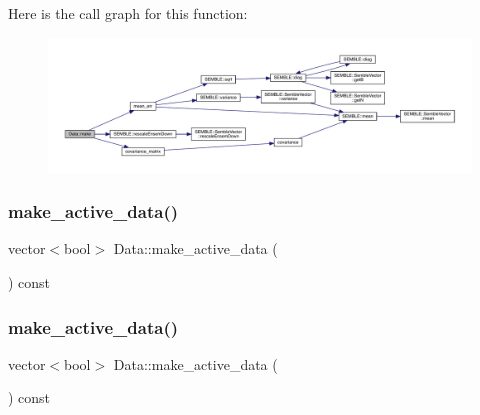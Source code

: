 Here is the call graph for this function\+:
\nopagebreak
\begin{figure}[H]
\begin{center}
\leavevmode
\includegraphics[width=350pt]{d0/df3/classData_acf9b4e6e52730e9da47d82bda61ac1ca_cgraph}
\end{center}
\end{figure}
\mbox{\label{classData_af5d089365e8be78e4cd486bda87f37b4}} 
\subsubsection{\texorpdfstring{make\_active\_data()}{make\_active\_data()}\hspace{0.1cm}{\footnotesize\ttfamily [1/2]}}
{\footnotesize\ttfamily vector$<$bool$>$ Data\+::make\+\_\+active\+\_\+data (\begin{DoxyParamCaption}{ }\end{DoxyParamCaption}) const\hspace{0.3cm}{\ttfamily [inline]}}

\mbox{\label{classData_af5d089365e8be78e4cd486bda87f37b4}} 
\subsubsection{\texorpdfstring{make\_active\_data()}{make\_active\_data()}\hspace{0.1cm}{\footnotesize\ttfamily [2/2]}}
{\footnotesize\ttfamily vector$<$bool$>$ Data\+::make\+\_\+active\+\_\+data (\begin{DoxyParamCaption}{ }\end{DoxyParamCaption}) const\hspace{0.3cm}{\ttfamily [inline]}}

